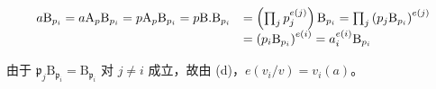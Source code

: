 \[
\begin{array}{r l} a \mathrm{B} _ {p _ {i}} = a \mathrm{A} _ {p} \mathrm{B} _ {p _ {i}} = p \mathrm{A} _ {p} \mathrm{B} _ {p _ {i}} = p \mathrm{B}. \mathrm{B} _ {p _ {i}} & = \left(\prod_ {j} p _ {j} ^ {e (j)}\right) \mathrm{B} _ {p _ {i}} = \prod_ {j} \left(p _ {j} \mathrm{B} _ {p _ {i}}\right) ^ {e (j)} \\ & = \left(p _ {i} \mathrm{B} _ {p _ {i}}\right) ^ {e (i)} = a _ {i} ^ {e (i)} \mathrm{B} _ {p _ {i}} \end{array}
\]

由于 \(\mathfrak{p}_j\mathrm{B}_{\mathfrak{p}_i} = \mathrm{B}_{\mathfrak{p}_i}\) 对 \(j\neq i\) 成立，故由 (d)，\(e(v_{i} / v) = v_{i}(a)\)。

